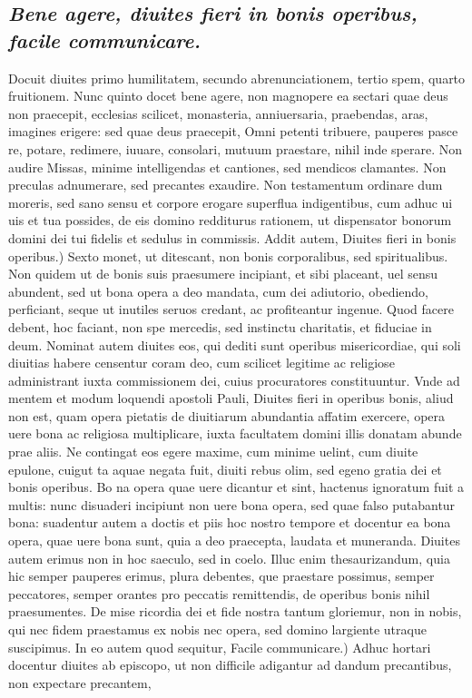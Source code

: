 \documentclass{article}
\begin{document}
\begin{pages}
\subsection*{\textit{Bene agere, diuites fieri in bonis operibus, facile communicare. }}\pstart Docuit diuites primo humilitatem, secundo abrenunciationem, tertio spem, quarto fruitionem. Nunc quinto docet bene agere, non magnopere ea sectari quae deus non praecepit, ecclesias scilicet, monasteria, anniuersaria, praebendas, aras, imagines erigere: sed quae deus praecepit, Omni petenti tribuere, pauperes pasce re, potare, redimere, iuuare, consolari, mutuum praestare, nihil inde sperare. Non audire Missas, minime intelligendas et cantiones, sed mendicos clamantes. Non preculas adnumerare, sed precantes exaudire. Non testamentum ordinare dum moreris, sed sano sensu et corpore erogare superflua indigentibus, cum adhuc ui uis et tua possides, de eis domino redditurus rationem, ut dispensator bonorum domini dei tui fidelis et sedulus in commissis. Addit autem, Diuites fieri in bonis operibus.) Sexto monet, ut ditescant, non bonis corporalibus, sed spiritualibus. Non quidem ut de bonis suis praesumere incipiant, et sibi placeant, uel sensu abundent, sed ut bona opera a deo mandata, cum dei adiutorio, obediendo, perficiant, seque ut inutiles seruos credant, ac profiteantur ingenue. Quod facere debent, hoc faciant, non spe mercedis, sed instinctu charitatis, et fiduciae in deum. Nominat autem diuites eos, qui dediti sunt operibus misericordiae, qui soli diuitias habere censentur coram deo, cum scilicet legitime ac religiose administrant iuxta commissionem dei, cuius procuratores constituuntur. Vnde ad mentem et modum loquendi apostoli Pauli, Diuites fieri in operibus bonis, aliud non est, quam opera pietatis de diuitiarum abundantia affatim exercere, opera uere bona ac religiosa multiplicare, iuxta facultatem domini illis donatam abunde prae aliis. Ne contingat eos egere maxime, cum minime uelint, cum diuite epulone, cuigut ta aquae negata fuit, diuiti rebus olim, sed egeno gratia dei et bonis operibus. Bo na opera quae uere dicantur et sint, hactenus ignoratum fuit a multis: nunc disuaderi incipiunt non uere bona opera, sed quae falso putabantur bona: suadentur autem a doctis et piis hoc nostro tempore et docentur ea bona opera, quae uere bona sunt, quia a deo praecepta, laudata et muneranda. Diuites autem erimus non in hoc saeculo, sed in coelo. Illuc enim thesaurizandum, quia hic semper pauperes erimus, plura debentes, que praestare possimus, semper peccatores, semper orantes pro peccatis remittendis, de operibus bonis nihil praesumentes. De mise ricordia dei et fide nostra tantum gloriemur, non in nobis, qui nec fidem praestamus ex nobis nec opera, sed domino largiente utraque suscipimus. In eo autem quod sequitur, Facile communicare.) Adhuc hortari docentur diuites ab episcopo, ut non difficile adigantur ad dandum precantibus, non expectare precantem,  \pend

\end{pages}
\end{document}
